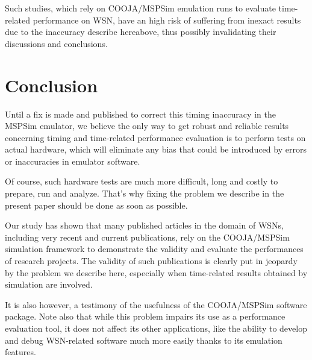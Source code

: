 \documentclass[a4paper,10pt]{article}
\begin{document}
Such studies, which rely on COOJA/MSPSim emulation runs to evaluate
time-related performance on WSN, have an high risk of suffering from
inexact results due to the inaccuracy describe hereabove, thus
possibly invalidating their discussions and conclusions.



\section{Conclusion}

Until a fix is made and published to correct this timing inaccuracy
in the MSPSim emulator, we believe the only way to get robust and reliable
results concerning timing and time-related performance evaluation is
to perform tests on actual hardware, which will eliminate any bias
that could be introduced by errors or inaccuracies in emulator software.

Of course, such hardware tests are much more difficult, long and
costly to prepare, run and analyze. That's why fixing the problem
we describe in the present paper should be done as soon as possible.

Our study has shown that many published articles in the domain of WSNs,
including very recent and current publications, rely on the COOJA/MSPSim
simulation framework to demonstrate the validity and evaluate the
performances of research projects. The validity of such publications
is clearly put in jeopardy by the problem we describe here, especially
when time-related results obtained by simulation are involved.

It is also however, a testimony of the usefulness of the COOJA/MSPSim
software package. Note also that while this problem impairs its use
as a performance evaluation tool, it does not affect its other applications,
like the ability to develop and debug WSN-related software much more easily
thanks to its emulation features.



\vfill

{\small
}
\end{document}
